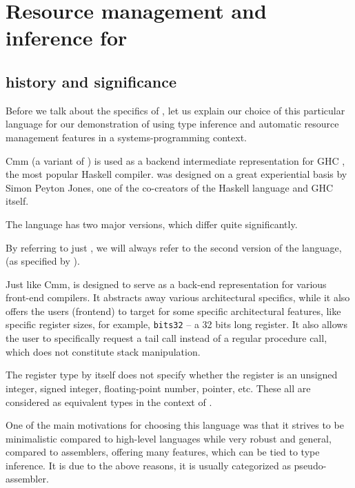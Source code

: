 \chapter{Resource management and inference for \cmm}

\label{chap2}

\section{\cmm history and significance}

Before we talk about the specifics of \cmm, let us explain our choice of this particular language for our demonstration of using type inference and automatic resource management features in a systems-programming context.

Cmm (a variant of \cmm) is used as a backend intermediate representation for GHC \cite{haskellbackends}, the most popular Haskell compiler. \cmm was designed on a great experiential basis by Simon Peyton Jones, one of the co-creators of the Haskell language and GHC itself.

\begin{remark}
    The \cmm language has two major versions, which differ quite significantly.

    By referring to just \cmm, we will always refer to the second version of the language,  (as specified by \citet{ramsey2005c}).
\end{remark}

Just like Cmm, \cmm is designed to serve as a back-end representation for various front-end compilers. It abstracts away various architectural specifics, while it also offers the users (frontend) to target for some specific architectural features, like specific register sizes, for example, \lstinline{bits32} -- a 32 bits long register. It also allows the user to specifically request a tail call instead of a regular procedure call, which does not constitute stack manipulation.

The register type by itself does not specify whether the register is an unsigned integer, signed integer, floating-point number, pointer, etc. These all are considered as equivalent types in the context of \cmm.

One of the main motivations for choosing this language was that it strives to be minimalistic compared to high-level languages while very robust and general, compared to assemblers, offering many features, which can be tied to type inference. It is due to the above reasons, it is usually categorized as pseudo-assembler.

